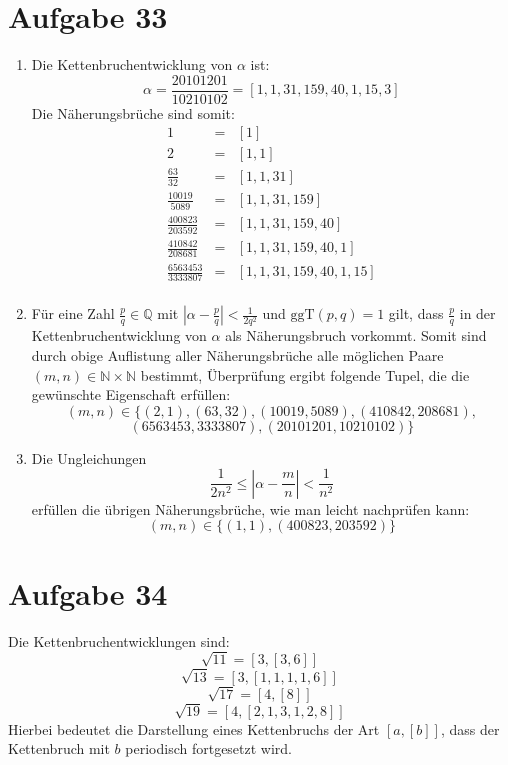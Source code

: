 \section*{Aufgabe 33}
\begin{enumerate}[(1)]
	\item Die Kettenbruchentwicklung von $\alpha$ ist:
	\[ \alpha = \frac{20101201}{10210102} = [ 1, 1, 31, 159, 40, 1, 15, 3 ] \]
	Die Näherungsbrüche sind somit:
	\begin{eqnarray*}
	1 &=& [1] \\
	2 &=& [1, 1] \\
	\frac{63}{32} &=& [1,1,31] \\
	\frac{10019 }{5089} &=& [1,1,31,159] \\
	\frac{400823}{203592} &=& [1,1,31,159,40] \\
	\frac{410842}{208681} &=& [1,1,31,159,40,1] \\
	\frac{6563453}{3333807} &=& [1,1,31,159,40,1,15] \\
	\end{eqnarray*}
		
	\item Für eine Zahl $\frac{p}{q} \in \mathbb{Q}$ mit $\left| \alpha -
	\frac{p}{q} \right| < \frac{1}{2 q^2}$ und $\text{ggT}(p,q) = 1$ gilt, dass
	$\frac{p}{q}$ in der Kettenbruchentwicklung von $\alpha$ als
	Näherungsbruch vorkommt.
	Somit sind durch obige Auflistung aller Näherungsbrüche alle möglichen Paare $(m,n) \in \mathbb{N} \times \mathbb{N}$ bestimmt, Überprüfung ergibt folgende Tupel, die die gewünschte Eigenschaft erfüllen:
	\[ (m,n) \in \{ (2,1), (63,32), (10019, 5089), (410842 ,208681 ), \]
	\[ (6563453 ,3333807 ), (20101201 ,10210102 )\} \]

	\item Die Ungleichungen 
	\[ \frac{1}{2 n^2} \leq \left| \alpha - \frac{m}{n} \right| < \frac{1}{n^2} \]
	erfüllen die übrigen Näherungsbrüche, wie man leicht nachprüfen kann:
	\[ (m,n) \in \{(1,1), (400823, 203592)\} \]
\end{enumerate}


\section*{Aufgabe 34}
Die Kettenbruchentwicklungen sind:
\[ \sqrt{11} = [3, [3, 6]] \]
\[ \sqrt{13} = [3, [1, 1, 1, 1, 6]] \]
\[ \sqrt{17} = [4, [8]] \]
\[ \sqrt{19} = [4, [2, 1, 3, 1, 2, 8]] \]
Hierbei bedeutet die Darstellung eines Kettenbruchs der Art $[a, [b]]$, dass
der Kettenbruch mit $b$ periodisch fortgesetzt wird.

